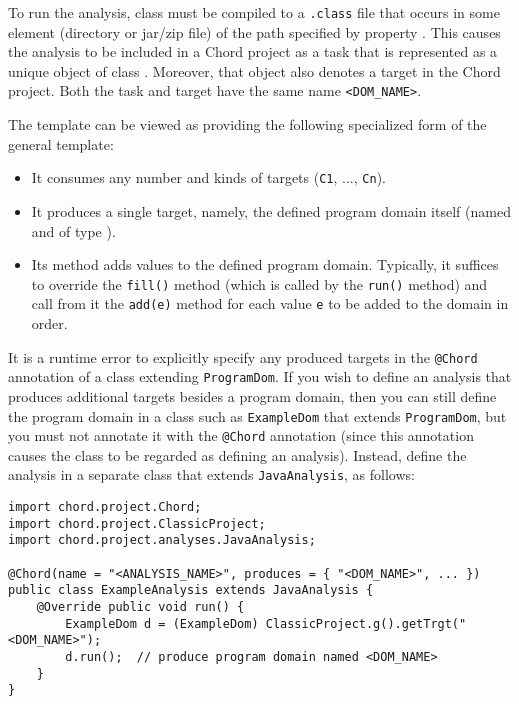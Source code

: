 To run the analysis, class  must be compiled to
a {\tt .class} file that occurs in some element (directory or jar/zip file) of the path
specified by property .
This causes the analysis to be included in a Chord project as a task
that is represented as a unique object of class .
Moreover, that object also denotes a target in the Chord project.  Both the
task and target have the same name {\tt <DOM_NAME>}.

The  template can be viewed as providing the following
specialized form of the general  template:

\begin{itemize}
\item
It consumes any number and kinds of targets ({\tt C1}, ..., {\tt Cn}).
\item
It produces a single target, namely, the defined program domain itself
(named  and of type ).
\item
Its  method adds values to the defined program domain.  Typically, it suffices to
override the {\tt fill()} method (which is called by the {\tt run()} method) and call from it the
{\tt add(e)} method for each value {\tt e} to be added to the domain in order.
\end{itemize}

It is a runtime error to explicitly specify any produced targets in the
{\tt @Chord} annotation of a class extending {\tt ProgramDom}.
If you wish to define an analysis that produces additional targets besides
a program domain, then you can still define the program domain in
a class such as {\tt ExampleDom} that extends {\tt ProgramDom}, but you must not
annotate it with the {\tt @Chord} annotation (since this annotation
causes the class to be regarded as defining an analysis).  Instead, define
the analysis in a separate class that extends {\tt JavaAnalysis}, as follows:

\begin{framed}
\begin{verbatim}
import chord.project.Chord;
import chord.project.ClassicProject;
import chord.project.analyses.JavaAnalysis;

@Chord(name = "<ANALYSIS_NAME>", produces = { "<DOM_NAME>", ... })
public class ExampleAnalysis extends JavaAnalysis {
    @Override public void run() {
        ExampleDom d = (ExampleDom) ClassicProject.g().getTrgt("<DOM_NAME>");
        d.run();  // produce program domain named <DOM_NAME>
    }
}
\end{verbatim}
\end{framed}

